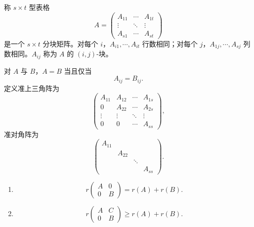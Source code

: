 \begin{definition}\label{3.5.1}\label{p1:concept:c3-l1322}
	称 $s\times t$ 型表格
	\[
	A=
	\begin{pmatrix}
		A_{11}&\cdots&A_{1t}\\
		\vdots&\ddots&\vdots\\
		A_{s1}&\cdots&A_{st}
	\end{pmatrix}
	\]
	是一个 $s\times t$ 分块矩阵。对每个 $i$，$A_{i1},\cdots,A_{it}$ 行数相同；对每个 $j$，$A_{1j},\cdots,A_{sj}$ 列数相同。$A_{ij}$ 称为 $A$ 的 $(i,j)$-块。
	
	对 $A$ 与 $B$，$A=B$ 当且仅当
	\[
	A_{ij}=B_{ij}.
	\]
	定义准上三角阵为
	\[
	\begin{pmatrix}
		A_{11}&A_{12}&\cdots&A_{1s}\\
		0&A_{22}&\cdots&A_{2s}\\
		\vdots&\vdots&\ddots&\vdots\\
		0&0&\cdots&A_{ss}
	\end{pmatrix},
	\]
	准对角阵为
	\[
	\begin{pmatrix}
		A_{11}&&&\\
		&A_{22}&&\\
		&&\ddots&\\
		&&&A_{ss}
	\end{pmatrix}.
	\]
\end{definition}

\begin{proposition}\label{3.5.2}
	\begin{enumerate}
		\item
		\[
		r\begin{pmatrix}
			A&0\\
			0&B
		\end{pmatrix}=r(A)+r(B).
		\]
		\item
		\[
		r\begin{pmatrix}
			A&C\\
			0&B
		\end{pmatrix}\geq r(A)+r(B).
		\]
	\end{enumerate}
\end{proposition}

